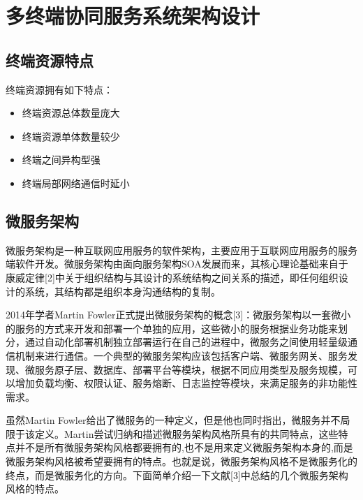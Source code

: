 \section{多终端协同服务系统架构设计}\label{sec:service_system_design}
\subsection{终端资源特点}
终端资源拥有如下特点：
\begin{itemize}
    \item 终端资源总体数量庞大
    \item 终端资源单体数量较少
    \item 终端之间异构型强
    \item 终端局部网络通信时延小
\end{itemize}

\subsection{微服务架构}

微服务架构是一种互联网应用服务的软件架构，主要应用于互联网应用服务的服务端软件开发。微服务架构由面向服务架构SOA发展而来，其核心理论基础来自于康威定律[2]中关于组织结构与其设计的系统结构之间关系的描述，即任何组织设计的系统，其结构都是组织本身沟通结构的复制。

2014年学者Martin Fowler正式提出微服务架构的概念[3]：微服务架构以一套微小的服务的方式来开发和部署一个单独的应用，这些微小的服务根据业务功能来划分，通过自动化部署机制独立部署运行在自己的进程中，微服务之间使用轻量级通信机制来进行通信。一个典型的微服务架构应该包括客户端、微服务网关、服务发现、微服务原子层、数据库、部署平台等模块，根据不同应用类型及服务规模，可以增加负载均衡、权限认证、服务熔断、日志监控等模块，来满足服务的非功能性需求。

虽然Martin Fowler给出了微服务的一种定义，但是他也同时指出，微服务并不局限于该定义。Martin尝试归纳和描述微服务架构风格所具有的共同特点，这些特点并不是所有微服务架构风格都要拥有的,也不是用来定义微服务架构本身的,而是微服务架构风格被希望要拥有的特点。也就是说，微服务架构风格不是微服务化的终点，而是微服务化的方向。下面简单介绍一下文献[3]中总结的几个微服务架构风格的特点。

